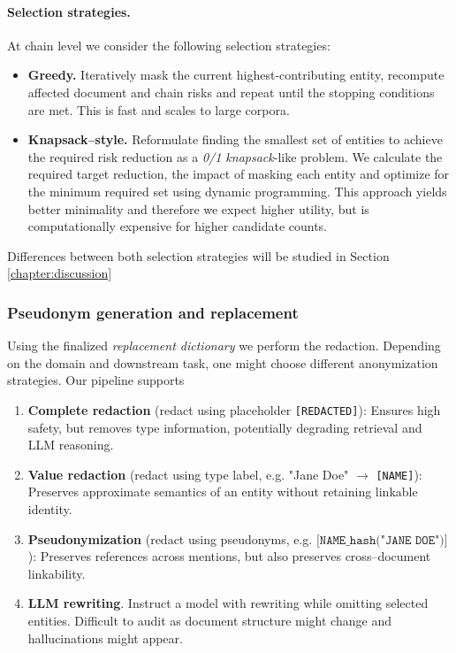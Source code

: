 \paragraph{Selection strategies.}
At chain level we consider the following selection strategies:
\begin{itemize}
  \item \textbf{Greedy.} Iteratively mask the current highest-contributing entity, recompute affected document and chain risks and repeat until the stopping conditions are met. This is fast and scales to large corpora.
  \item \textbf{Knapsack–style.} Reformulate finding the smallest set of entities to achieve the required risk reduction as a \textit{0/1 knapsack}-like problem. We calculate the required target reduction, the impact of masking each entity and optimize for the minimum required set using dynamic programming. This approach yields better minimality and therefore we expect higher utility, but is computationally expensive for higher candidate counts.
\end{itemize}
Differences between both selection strategies will be studied in Section \ref{chapter:discussion} %

\subsubsection{Pseudonym generation and replacement}
Using the finalized \textit{replacement dictionary} we perform the redaction. Depending on the domain and downstream task, one might choose different anonymization strategies. Our pipeline supports 
\begin{enumerate}
  \item \textbf{Complete redaction} (redact using placeholder \texttt{[REDACTED]}): Ensures high safety, but removes type information, potentially degrading retrieval and LLM reasoning.
  \item \textbf{Value redaction} (redact using type label, e.g. "Jane Doe" $\rightarrow$ \texttt{[NAME]}): Preserves approximate semantics of an entity without retaining linkable identity.
  \item \textbf{Pseudonymization} (redact using pseudonyms, e.g. $\texttt{[NAME\_{hash}("JANE DOE")]}$): Preserves references across mentions, but also preserves cross–document linkability. 
  \item \textbf{LLM rewriting}. Instruct a model with rewriting while omitting selected entities. Difficult to audit as document structure might change and hallucinations might appear.  
\end{enumerate}

